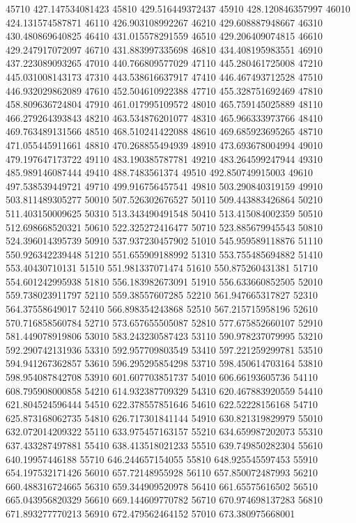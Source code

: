 {45710 427.147534081423
45810 429.516449372437
45910 428.120846357997
46010 424.131574587871
46110 426.903108992267
46210 429.608887948667
46310 430.480869640825
46410 431.015578291559
46510 429.206409074815
46610 429.247917072097
46710 431.883997335698
46810 434.408195983551
46910 437.223089093265
47010 440.766809577029
47110 445.280461725008
47210 445.031008143173
47310 443.538616637917
47410 446.467493712528
47510 446.932029862089
47610 452.504610922388
47710 455.328751692469
47810 458.809636724804
47910 461.017995109572
48010 465.759145025889
48110 466.279264393843
48210 463.534876201077
48310 465.966333973766
48410 469.763489131566
48510 468.510241422088
48610 469.685923695265
48710 471.055445911661
48810 470.268855494939
48910 473.693678004994
49010 479.197647173722
49110 483.190385787781
49210 483.264599247944
49310 485.989146087444
49410 488.7483561374
49510 492.850749915003
49610 497.538539449721
49710 499.916756457541
49810 503.290840319159
49910 503.811489305277
50010 507.526302676527
50110 509.443883426864
50210 511.403150009625
50310 513.343490491548
50410 513.415084002359
50510 512.698668520321
50610 522.325272416477
50710 523.885679945543
50810 524.396014395739
50910 537.937230457902
51010 545.959589118876
51110 550.926342239448
51210 551.655909188992
51310 553.755485694882
51410 553.40430710131
51510 551.981337071474
51610 550.875260431381
51710 554.601242995938
51810 556.183982673091
51910 556.633660852505
52010 559.738023911797
52110 559.38557607285
52210 561.947665317827
52310 564.37558649017
52410 566.898354243868
52510 567.215715958196
52610 570.716858560784
52710 573.657655505087
52810 577.675852660107
52910 581.449078919806
53010 583.243230587423
53110 590.978237079995
53210 592.290742131936
53310 592.957709803549
53410 597.221259299781
53510 594.941267362857
53610 596.295295854298
53710 598.450614703164
53810 598.954087842708
53910 601.607703851737
54010 606.66193605736
54110 608.795908000858
54210 614.932387709329
54310 620.467883920559
54410 621.804524596444
54510 622.378557851646
54610 622.52228156168
54710 625.873168062735
54810 626.717301841144
54910 630.821319829979
55010 632.072014209322
55110 633.975457163157
55210 634.659987202073
55310 637.433287497881
55410 638.413518021233
55510 639.749850282304
55610 640.19957446188
55710 646.244657154055
55810 648.925545597453
55910 654.197532171426
56010 657.72148955928
56110 657.850072487993
56210 660.488316724665
56310 659.344909520978
56410 661.65575616502
56510 665.043956820329
56610 669.144609770782
56710 670.974698137283
56810 671.893277770213
56910 672.479562464152
57010 673.380975668001
}
